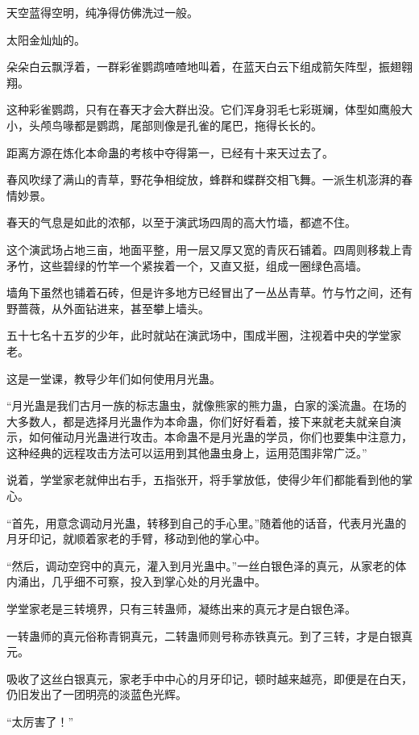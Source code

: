 
\begin{this_body}

天空蓝得空明，纯净得仿佛洗过一般。

太阳金灿灿的。

朵朵白云飘浮着，一群彩雀鹦鹉喳喳地叫着，在蓝天白云下组成箭矢阵型，振翅翱翔。

这种彩雀鹦鹉，只有在春天才会大群出没。它们浑身羽毛七彩斑斓，体型如鹰般大小，头颅鸟喙都是鹦鹉，尾部则像是孔雀的尾巴，拖得长长的。

距离方源在炼化本命蛊的考核中夺得第一，已经有十来天过去了。

春风吹绿了满山的青草，野花争相绽放，蜂群和蝶群交相飞舞。一派生机澎湃的春情妙景。

春天的气息是如此的浓郁，以至于演武场四周的高大竹墙，都遮不住。

这个演武场占地三亩，地面平整，用一层又厚又宽的青灰石铺着。四周则移栽上青矛竹，这些碧绿的竹竿一个紧挨着一个，又直又挺，组成一圈绿色高墙。

墙角下虽然也铺着石砖，但是许多地方已经冒出了一丛丛青草。竹与竹之间，还有野蔷薇，从外面钻进来，甚至攀上墙头。

五十七名十五岁的少年，此时就站在演武场中，围成半圈，注视着中央的学堂家老。

这是一堂课，教导少年们如何使用月光蛊。

“月光蛊是我们古月一族的标志蛊虫，就像熊家的熊力蛊，白家的溪流蛊。在场的大多数人，都是选择月光蛊作为本命蛊，你们好好看着，接下来就老夫就亲自演示，如何催动月光蛊进行攻击。本命蛊不是月光蛊的学员，你们也要集中注意力，这种经典的远程攻击方法可以运用到其他蛊虫身上，运用范围非常广泛。”

说着，学堂家老就伸出右手，五指张开，将手掌放低，使得少年们都能看到他的掌心。

“首先，用意念调动月光蛊，转移到自己的手心里。”随着他的话音，代表月光蛊的月牙印记，就顺着家老的手臂，移动到他的掌心中。

“然后，调动空窍中的真元，灌入到月光蛊中。”一丝白银色泽的真元，从家老的体内涌出，几乎细不可察，投入到掌心处的月光蛊中。

学堂家老是三转境界，只有三转蛊师，凝练出来的真元才是白银色泽。

一转蛊师的真元俗称青铜真元，二转蛊师则号称赤铁真元。到了三转，才是白银真元。

吸收了这丝白银真元，家老手中中心的月牙印记，顿时越来越亮，即便是在白天，仍旧发出了一团明亮的淡蓝色光辉。

“太厉害了！”


\end{this_body}
